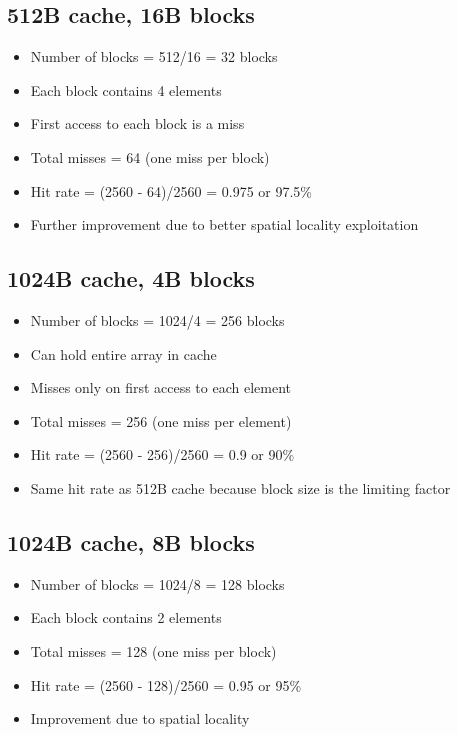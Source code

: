 \documentclass{article}
\begin{document}
\subsection{512B cache, 16B blocks}
\begin{itemize}
    \item Number of blocks = 512/16 = 32 blocks
    \item Each block contains 4 elements
    \item First access to each block is a miss
    \item Total misses = 64 (one miss per block)
    \item Hit rate = (2560 - 64)/2560 = 0.975 or 97.5\%
    \item Further improvement due to better spatial locality exploitation
\end{itemize}

\subsection{1024B cache, 4B blocks}
\begin{itemize}
    \item Number of blocks = 1024/4 = 256 blocks
    \item Can hold entire array in cache
    \item Misses only on first access to each element
    \item Total misses = 256 (one miss per element)
    \item Hit rate = (2560 - 256)/2560 = 0.9 or 90\%
    \item Same hit rate as 512B cache because block size is the limiting factor
\end{itemize}

\subsection{1024B cache, 8B blocks}
\begin{itemize}
    \item Number of blocks = 1024/8 = 128 blocks
    \item Each block contains 2 elements
    \item Total misses = 128 (one miss per block)
    \item Hit rate = (2560 - 128)/2560 = 0.95 or 95\%
    \item Improvement due to spatial locality
\end{itemize}
\end{document}
